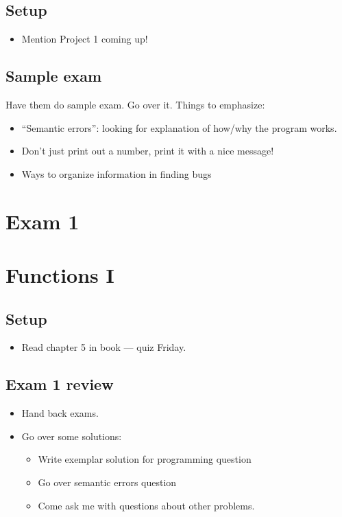 \documentclass{article}
\begin{document}
\subsection*{Setup}

\begin{itemize}
\item Mention Project 1 coming up!
\end{itemize}

\subsection*{Sample exam}

Have them do sample exam. Go over it.  Things to emphasize:
\begin{itemize}
\item ``Semantic errors'': looking for explanation of how/why the
  program works.
\item Don't just print out a number, print it with a nice message!
\item Ways to organize information in finding bugs
\end{itemize}

\section{Exam 1}

\newpage

\section{Functions I}

\subsection*{Setup}
\begin{itemize}
\item Read chapter 5 in book --- quiz Friday.
\end{itemize}

\subsection*{Exam 1 review}
\begin{itemize}
\item Hand back exams.
\item Go over some solutions:
  \begin{itemize}
  \item Write exemplar solution for programming question
  \item Go over semantic errors question
  \item Come ask me with questions about other problems.
  \end{itemize}
\end{itemize}
\end{document}
